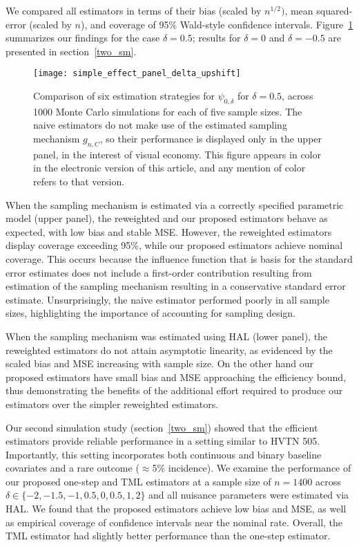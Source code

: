 We compared all estimators in terms of their bias (scaled by $n^{1/2})$, mean
squared-error (scaled by $n$), and coverage of 95\% Wald-style confidence
intervals. Figure~\ref{fig:simple_sim_delta_upshift} summarizes our findings for
the case $\delta = 0.5$; results for $\delta = 0$ and $\delta = -0.5$ are
presented in section~\ref{two_sm}.
\begin{figure}[H]
  \centering
  \texttt{[image: simple\_effect\_panel\_delta\_upshift]}
  \caption{Comparison of six estimation strategies
  for $\psi_{0,\delta}$ for $\delta = 0.5$, across 1000 Monte Carlo simulations
  for each of five sample sizes. The naive estimators do not make use of the
  estimated sampling mechanism $g_{n,C}$, so their performance is displayed
  only in the upper panel, in the interest of visual economy. This figure
  appears in color in the electronic version of this article, and any mention
  of color refers to that version.}
  \label{fig:simple_sim_delta_upshift}
\end{figure}

When the sampling mechanism is estimated via a correctly specified parametric
model (upper panel), the reweighted and our proposed estimators behave as
expected, with low bias and stable MSE. However, the reweighted estimators
display coverage exceeding 95\%, while our proposed estimators achieve nominal
coverage. This occurs because the influence function that is basis for the
standard error estimates does not include a first-order contribution resulting
from estimation of the sampling mechanism resulting in a conservative standard
error estimate. Unsurprisingly, the naive estimator performed poorly in all
sample sizes, highlighting the importance of accounting for sampling design.

When the sampling mechanism was estimated using HAL (lower panel), the
reweighted estimators do not attain asymptotic linearity, as evidenced by the
scaled bias and MSE increasing with sample size. On the other hand our proposed
estimators have small bias and MSE approaching the efficiency bound, thus
demonstrating the benefits of the additional effort required to produce our
estimators over the simpler reweighted estimators.

Our second simulation study (section~\ref{two_sm}) showed that the
efficient estimators provide reliable performance in a setting similar to HVTN
505. Importantly, this setting incorporates both continuous and binary baseline
covariates and a rare outcome ($\approx$5\% incidence). We examine the
performance of our proposed one-step and TML estimators at a sample size of $n
= 1400$ across $\delta \in \{-2, -1.5, -1, 0.5, 0, 0.5, 1, 2\}$ and all nuisance
parameters were estimated via HAL. We found that the proposed estimators achieve
low bias and MSE, as well as empirical coverage of confidence intervals near the
nominal rate. Overall, the TML estimator had slightly better performance than
the one-step estimator.

